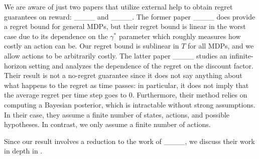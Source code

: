 We are aware of just two papers that utilize external help to obtain regret guarantees on reward: ____ and ____. The former paper ____ does provide a regret bound for general MDPs, but their regret bound is linear in the worst case due to its dependence on the $\gamma^*$ parameter which roughly measures how costly an action can be. Our regret bound is sublinear in $T$ for all MDPs, and we allow actions to be arbitrarily costly. The latter paper ____ studies an infinite-horizon setting and analyzes the dependence of the regret on the discount factor. Their result is not a no-regret guarantee since it does not say anything about what happens to the regret as time passes: in particular, it does not imply that the average regret per time step goes to 0. Furthermore, their method relies on computing a Bayesian posterior, which is intractable without strong assumptions. In their case, they assume a finite number of states, actions, and possible hypotheses. In contrast, we only assume a finite number of actions.

Since our result involves a reduction to the work of ____, we discuss their work in depth in . 